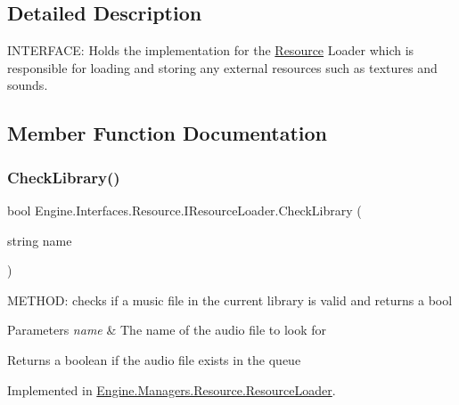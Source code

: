 \subsection{Detailed Description}
I\+N\+T\+E\+R\+F\+A\+CE\+: Holds the implementation for the \hyperlink{a00262}{Resource} Loader which is responsible for loading and storing any external resources such as textures and sounds. 



\subsection{Member Function Documentation}
\mbox{\label{a00462_a08d51ffa3d65fd1122614e00a275cf48}} 
\subsubsection{\texorpdfstring{Check\+Library()}{CheckLibrary()}}
{\footnotesize\ttfamily bool Engine.\+Interfaces.\+Resource.\+I\+Resource\+Loader.\+Check\+Library (\begin{DoxyParamCaption}\item[{string}]{name }\end{DoxyParamCaption})}



M\+E\+T\+H\+OD\+: checks if a music file in the current library is valid and returns a bool 


\begin{DoxyParams}{Parameters}
{\em name} & The name of the audio file to look for\\
\hline
\end{DoxyParams}
\begin{DoxyReturn}{Returns}
a boolean if the audio file exists in the queue
\end{DoxyReturn}


Implemented in \hyperlink{a00530_a939824a1d16e96b4322225a18f7a47d6}{Engine.\+Managers.\+Resource.\+Resource\+Loader}.

\mbox{\label{a00462_abe9339a97b29bce2ba8a77504495f27d}} 
